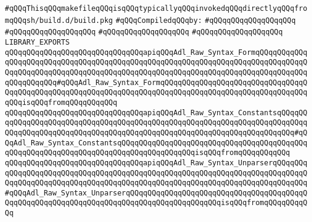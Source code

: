 \label{src/lib/compiler/back/low/tools/sml-ast.lib}
\verb|#qQQqThisqQQqmakefileqQQqisqQQqtypicallyqQQqinvokedqQQqdirectlyqQQqfromqQQqsh/build.d/build.pkg|\newline
\newline
\verb|#qQQqCompiledqQQqby:|\newline
\verb|#qQQqqQQqqQQqqQQqqQQq|\newline
\verb|#qQQqqQQqqQQqqQQqqQQq|\newline
\verb|#qQQqqQQqqQQqqQQqqQQq|\newline
\verb|#qQQqqQQqqQQqqQQqqQQq|\newline
\newline
\verb|LIBRARY_EXPORTS|\newline
\newline
\verb|qQQqqQQqqQQqqQQqqQQqqQQqqQQqqQQqapiqQQqAdl_Raw_Syntax_FormqQQqqQQqqQQqqQQqqQQqqQQqqQQqqQQqqQQqqQQqqQQqqQQqqQQqqQQqqQQqqQQqqQQqqQQqqQQqqQQqqQQqqQQqqQQqqQQqqQQqqQQqqQQqqQQqqQQqqQQqqQQqqQQqqQQqqQQqqQQqqQQqqQQqqQQqqQQqqQQqqQQq#qQQqAdl_Raw_Syntax_FormqQQqqQQqqQQqqQQqqQQqqQQqqQQqqQQqqQQqqQQqqQQqqQQqqQQqqQQqqQQqqQQqqQQqqQQqqQQqqQQqqQQqqQQqqQQqqQQqqQQqqQQqqQQqisqQQqfromqQQqqQQqqQQq|\newline
\verb|qQQqqQQqqQQqqQQqqQQqqQQqqQQqqQQqapiqQQqAdl_Raw_Syntax_ConstantsqQQqqQQqqQQqqQQqqQQqqQQqqQQqqQQqqQQqqQQqqQQqqQQqqQQqqQQqqQQqqQQqqQQqqQQqqQQqqQQqqQQqqQQqqQQqqQQqqQQqqQQqqQQqqQQqqQQqqQQqqQQqqQQqqQQqqQQqqQQqqQQq#qQQqAdl_Raw_Syntax_ConstantsqQQqqQQqqQQqqQQqqQQqqQQqqQQqqQQqqQQqqQQqqQQqqQQqqQQqqQQqqQQqqQQqqQQqqQQqqQQqqQQqqQQqqQQqisqQQqfromqQQqqQQqqQQq|\newline
\verb|qQQqqQQqqQQqqQQqqQQqqQQqqQQqqQQqapiqQQqAdl_Raw_Syntax_UnparserqQQqqQQqqQQqqQQqqQQqqQQqqQQqqQQqqQQqqQQqqQQqqQQqqQQqqQQqqQQqqQQqqQQqqQQqqQQqqQQqqQQqqQQqqQQqqQQqqQQqqQQqqQQqqQQqqQQqqQQqqQQqqQQqqQQqqQQqqQQqqQQqqQQq#qQQqAdl_Raw_Syntax_UnparserqQQqqQQqqQQqqQQqqQQqqQQqqQQqqQQqqQQqqQQqqQQqqQQqqQQqqQQqqQQqqQQqqQQqqQQqqQQqqQQqqQQqqQQqqQQqisqQQqfromqQQqqQQqqQQq|\newline
